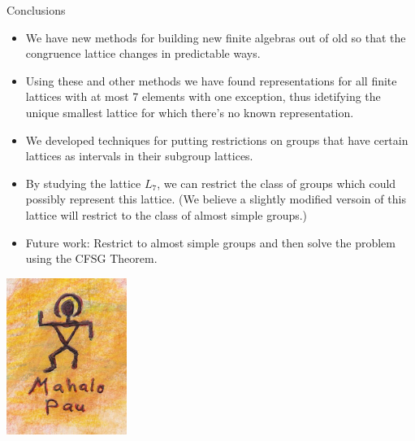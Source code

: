 \begin{frame}[fragile,label=FinalConclusions]{Conclusions}
  \begin{itemize}
  \item<1-5> We have new methods for building new finite algebras out of
    old so that the congruence lattice changes in predictable ways.
\vskip2mm
  \item<2-5> Using these and other methods we have found representations for all
    finite lattices with at most 7 elements with one exception, thus
    idetifying the unique smallest lattice for which there's no known
    representation. 
\vskip2mm
  \item<3-5> We developed techniques for putting restrictions on groups that
    have certain lattices as intervals in their subgroup lattices.
\vskip2mm
\item<4-5> By studying the lattice $L_7$, we can restrict the class of
  groups which could possibly represent this lattice.  (We believe a slightly
  modified versoin of this lattice will restrict to the class of almost simple
  groups.)
\vskip2mm
\item<5-5> Future work: Restrict to almost simple groups and then solve the problem using the CFSG Theorem.
  \end{itemize}
\end{frame}
\begin{frame}[fragile,label=FinalConclusions]{}
  \begin{center}
  \includegraphics[height=2in]{MahaloPau}
  \end{center}
\end{frame}
